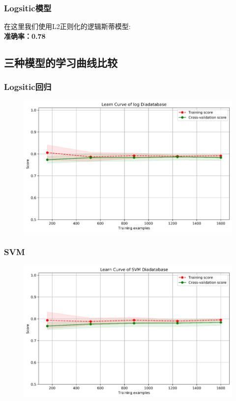 \documentclass[12pt]{article}
\begin{document}
\subsubsection{Logsitic模型}
\begin{flushleft}
	\noindent\qquad 在这里我们使用L2正则化的逻辑斯蒂模型:\\
	\textbf{准确率：0.78}
	
\end{flushleft}

\newpage

\subsection{三种模型的学习曲线比较}

\subsubsection{Logsitic回归}
\begin{figure}[H]
	\centering
	\includegraphics[width=0.7\linewidth]{figures/screenshot013}
	\caption{}
\end{figure}

\subsubsection{SVM}
\begin{figure}[H]
	\centering
	\includegraphics[width=0.7\linewidth]{figures/screenshot014}
	\caption{}
\end{figure}
\end{document}
